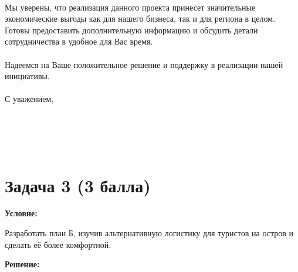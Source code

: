 \documentclass[a4paper,12pt]{article}
\begin{document}
\begin{flushleft}
\\
Мы уверены, что реализация данного проекта принесет значительные экономические выгоды как для нашего бизнеса, так и для региона в целом. Готовы предоставить дополнительную информацию и обсудить детали сотрудничества в удобное для Вас время. \\
\\
Надеемся на Ваше положительное решение и поддержку в реализации нашей инициативы. \\
\\
С уважением, \\
[Ваше Имя] \\
[Должность] \\
[Контактная информация] \\
[Электронная почта] \\
[Телефон]
\end{flushleft}

\section*{Задача 3 (3 балла)}

\textbf{Условие:} 

Разработать план Б, изучив альтернативную логистику для туристов на остров и сделать её более комфортной.

\textbf{Решение:}
\end{document}
